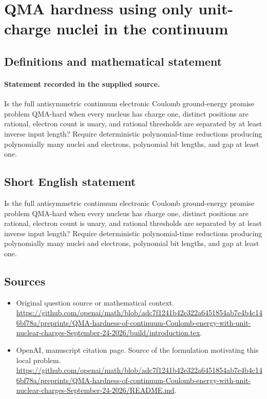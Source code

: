 \documentclass[11pt]{article}
\begin{document}
\section*{QMA hardness using only unit-charge nuclei in the continuum}\label{30007250}
\subsection{Definitions and mathematical statement}
\paragraph{Statement recorded in the supplied source.}
Is the full antisymmetric continuum electronic Coulomb ground-energy promise problem QMA-hard when every nucleus has charge one, distinct positions are rational, electron count is unary, and rational thresholds are separated by at least inverse input length? Require deterministic polynomial-time reductions producing polynomially many nuclei and electrons, polynomial bit lengths, and gap at least one.
\subsection{Short English statement}
Is the full antisymmetric continuum electronic Coulomb ground-energy promise problem QMA-hard when every nucleus has charge one, distinct positions are rational, electron count is unary, and rational thresholds are separated by at least inverse input length? Require deterministic polynomial-time reductions producing polynomially many nuclei and electrons, polynomial bit lengths, and gap at least one.
\subsection{Sources}
\begin{itemize}
\item[S1] Original question source or mathematical context.
\url{https://github.com/openai/math/blob/adc7f1241b42e322a6451854ab7e4b4c146bf78a/preprints/QMA-hardness-of-continuum-Coulomb-energy-with-unit-nuclear-charges-September-24-2026/build/introduction.tex}.
\item[S2] OpenAI, manuscript citation page. Source of the formulation motivating this local problem.
\url{https://github.com/openai/math/blob/adc7f1241b42e322a6451854ab7e4b4c146bf78a/preprints/QMA-hardness-of-continuum-Coulomb-energy-with-unit-nuclear-charges-September-24-2026/README.md}.
\end{itemize}
\end{document}
